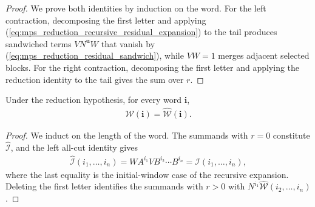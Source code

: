 \begin{proof}
    \leanok
    We prove both identities by induction on the word.  For the left
    contraction, decomposing the first letter and applying
    (\ref{eq:mps_reduction_recursive_residual_expansion}) to the tail produces
    sandwiched terms $VN^{\mathbf u}W$ that vanish by
    (\ref{eq:mps_reduction_residual_sandwich}), while $VW=1$ merges adjacent
    selected blocks.  For the right contraction, decomposing the first letter
    and applying the reduction identity to the tail gives the sum over $r$.
\end{proof}

\begin{lemma}
    \label{thm:mps_reduction_strict_window_range}
    \leanok
    Under the reduction hypothesis, for every word $\mathbf i$,
    \begin{align}
        \mathcal W(\mathbf i)=\widehat{\mathcal W}(\mathbf i).
    \end{align}
\end{lemma}

\begin{proof}
    \leanok
    We induct on the length of the word.  The summands with $r=0$ constitute
    $\widehat{\mathcal I}$, and the left all-cut identity gives
    \begin{align}
        \widehat{\mathcal I}(i_1,\ldots,i_n)
        =WA^{i_1}VB^{i_2}\cdots B^{i_n}
        =\mathcal I(i_1,\ldots,i_n),
    \end{align}
    where the last equality is the initial-window case of the recursive
    expansion.  Deleting the first letter identifies the summands with $r>0$
    with $N^{i_1}\widehat{\mathcal W}(i_2,\ldots,i_n)$.
\end{proof}

